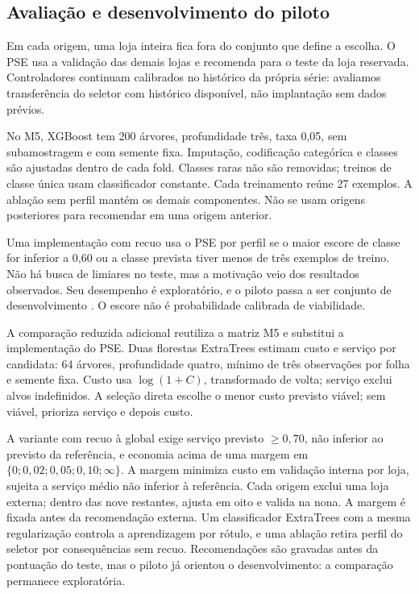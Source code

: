 \documentclass[preprint,12pt]{elsarticle}
\begin{document}
\subsection{Avaliação e desenvolvimento do piloto}
Em cada origem, uma loja inteira fica fora do conjunto que define a escolha. O PSE usa a validação das demais lojas e recomenda para o teste da loja reservada. Controladores continuam calibrados no histórico da própria série: avaliamos transferência do seletor com histórico disponível, não implantação sem dados prévios.

No M5, XGBoost tem 200 árvores, profundidade três, taxa 0,05, sem subamostragem e com semente fixa. Imputação, codificação categórica e classes são ajustadas dentro de cada fold. Classes raras não são removidas; treinos de classe única usam classificador constante. Cada treinamento reúne 27 exemplos. A ablação sem perfil mantém os demais componentes. Não se usam origens posteriores para recomendar em uma origem anterior.

Uma implementação com recuo usa o PSE por perfil se o maior escore de classe for inferior a 0,60 ou a classe prevista tiver menos de três exemplos de treino. Não há busca de limiares no teste, mas a motivação veio dos resultados observados. Seu desempenho é exploratório, e o piloto passa a ser conjunto de desenvolvimento \cite{CawleyTalbot2010}. O escore não é probabilidade calibrada de viabilidade.

A comparação reduzida adicional reutiliza a matriz M5 e substitui a implementação do PSE. Duas florestas ExtraTrees estimam custo e serviço por candidata: 64 árvores, profundidade quatro, mínimo de três observações por folha e semente fixa. Custo usa $\log(1+C)$, transformado de volta; serviço exclui alvos indefinidos. A seleção direta escolhe o menor custo previsto viável; sem viável, prioriza serviço e depois custo.

A variante com recuo à global exige serviço previsto $\geq0{,}70$, não inferior ao previsto da referência, e economia acima de uma margem em $\{0;0{,}02;0{,}05;0{,}10;\infty\}$. A margem minimiza custo em validação interna por loja, sujeita a serviço médio não inferior à referência. Cada origem exclui uma loja externa; dentro das nove restantes, ajusta em oito e valida na nona. A margem é fixada antes da recomendação externa. Um classificador ExtraTrees com a mesma regularização controla a aprendizagem por rótulo, e uma ablação retira perfil do seletor por consequências sem recuo. Recomendações são gravadas antes da pontuação do teste, mas o piloto já orientou o desenvolvimento: a comparação permanece exploratória.
\end{document}
